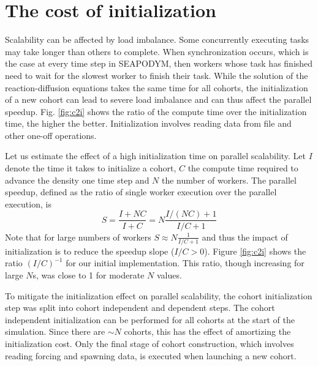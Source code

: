 \documentclass[a4paper,oneside,12pt]{article}
\begin{document}
\section{The cost of initialization}

Scalability can be affected by load imbalance. Some concurrently executing tasks may take longer than others
to complete. When synchronization occurs, which is the case at every time step in SEAPODYM, then 
workers whose task has finished need to wait for the slowest worker to finish their task. While the solution of
the reaction-diffusion equations takes the same time for all cohorts, the initialization of a new cohort
can lead to severe load imbalance and can thus affect the parallel speedup. 
Fig. \ref{fig:c2i} shows the ratio of the compute time over the initialization time, the higher the 
better. Initialization involves reading data from file and other one-off operations. 

Let us estimate the effect of a high initialization time on parallel scalability. 
Let $I$ denote the time it takes to initialize a cohort, $C$ the compute time required to advance the density one time step and $N$ the 
number of workers. The parallel speedup, defined as the ratio of single worker execution over the 
parallel execution, is
\begin{equation}
    S = \frac{I + N C}{I + C} = N \frac{I/(NC) + 1}{I/C + 1}
\end{equation}
Note that for large numbers of workers $S \approx N \frac{1}{I/C + 1}$ and thus the impact of initialization is to reduce the speedup slope 
($I/C > 0$). Figure \ref{fig:c2i} shows the ratio $(I/C)^{-1}$ for our initial implementation. This ratio, though increasing for 
large $N$s, was close to 1 for moderate $N$ values. 

To mitigate the initialization effect on parallel scalability, the cohort 
initialization step was split into cohort independent and dependent steps. The cohort independent initialization can be performed 
for all cohorts at the start of the simulation. Since there are $\sim N$ cohorts, this has the effect of amortizing the initialization 
cost. Only the final stage of cohort construction, which 
involves reading forcing and spawning data, is executed when launching a new cohort. 
\end{document}
